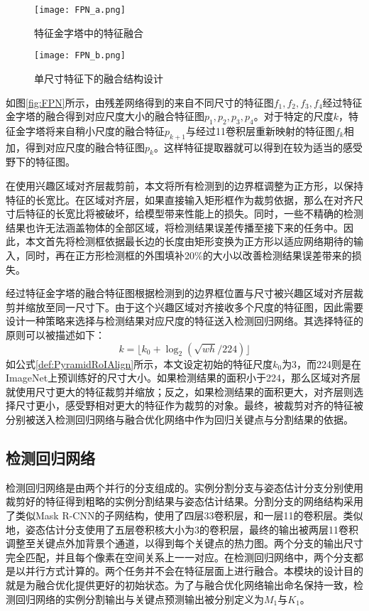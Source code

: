 \begin{figure*}[htbp]	
	\centering
	\begin{subfigure}[b]{0.4\textwidth}
		\texttt{[image: FPN\_a.png]}
		\caption{特征金字塔中的特征融合}
	\end{subfigure}
	\hskip1.5cm
	\begin{subfigure}[b]{0.4\textwidth}
		\texttt{[image: FPN\_b.png]}
		\caption{单尺寸特征下的融合结构设计}
	\end{subfigure}
	\caption{特征金字塔中的结构设计}
	\label{fig:FPN}
\end{figure*}

如图\ref{fig:FPN}所示，由残差网络得到的来自不同尺寸的特征图$f_1, f_2, f_3, f_4$经过特征金字塔的融合得到对应尺度大小的融合特征图$p_1, p_2, p_3, p_4$。对于特定的尺度$k$，特征金字塔将来自稍小尺度的融合特征$p_{k+1}$与经过1\times1卷积层重新映射的特征图$f_k$相加，得到对应尺度的融合特征图$p_k$。这样特征提取器就可以得到在较为适当的感受野下的特征图。

在使用兴趣区域对齐层裁剪前，本文将所有检测到的边界框调整为正方形，以保持特征的长宽比。在区域对齐层，如果直接输入矩形框作为裁剪依据，那么在对齐尺寸后特征的长宽比将被破坏，给模型带来性能上的损失。同时，一些不精确的检测结果也许无法涵盖物体的全部区域，将检测结果误差传播至接下来的任务中。因此，本文首先将检测框依据最长边的长度由矩形变换为正方形以适应网络期待的输入，同时，再在正方形检测框的外围填补20\%的大小以改善检测结果误差带来的损失。

经过特征金字塔的融合特征图根据检测到的边界框位置与尺寸被兴趣区域对齐层裁剪并缩放至同一尺寸下。由于这个兴趣区域对齐接收多个尺度的特征图，因此需要设计一种策略来选择与检测结果对应尺度的特征送入检测回归网络。其选择特征的原则可以被描述如下：
\begin{equation}
\label{def:PyramidRoIAlign}
k =\lfloor k_0 + \log_{2}(\sqrt{wh} / 224) \rfloor
\end{equation}
如公式\eqref{def:PyramidRoIAlign}所示，本文设定初始的特征尺度$k_0$为3，而224则是在ImageNet上预训练好的尺寸大小。如果检测结果的面积小于224，那么区域对齐层就使用尺寸更大的特征裁剪并缩放；反之，如果检测结果的面积更大，对齐层则选择尺寸更小，感受野相对更大的特征作为裁剪的对象。最终，被裁剪对齐的特征被分别被送入检测回归网络与融合优化网络中作为回归关键点与分割结果的依据。

\subsection{检测回归网络}
\label{subsec:detection}
检测回归网络是由两个并行的分支组成的。实例分割分支与姿态估计分支分别使用裁剪好的特征得到粗略的实例分割结果与姿态估计结果。分割分支的网络结构采用了类似Mask R-CNN\cite{He2017Mask}的子网结构，使用了四层3\times3卷积层，和一层1\times1的卷积层。类似地，姿态估计分支使用了五层卷积核大小为3的卷积层，最终的输出被两层1\times1卷积调整至关键点外加背景个通道，以得到每个关键点的热力图。两个分支的输出尺寸完全匹配，并且每个像素在空间关系上一一对应。在检测回归网络中，两个分支都是以并行方式计算的。两个任务并不会在特征层面上进行融合。本模块的设计目的就是为融合优化提供更好的初始状态。为了与融合优化网络输出命名保持一致，检测回归网络的实例分割输出与关键点预测输出被分别定义为$M_1$与$K_1$。


